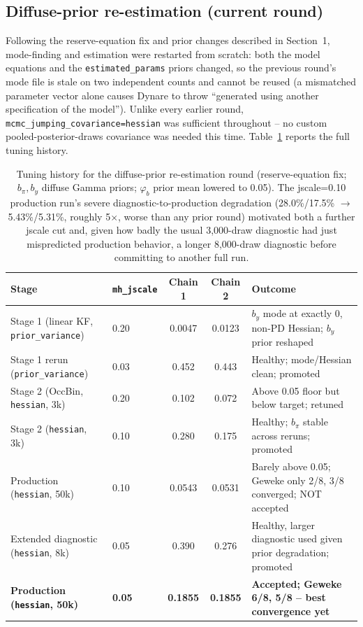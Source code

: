 \documentclass[11pt]{article}
\begin{document}
\subsection{Diffuse-prior re-estimation (current round)}
\label{sec:diffuse}

Following the reserve-equation fix and prior changes described in
Section~1, mode-finding and estimation were restarted from scratch: both
the model equations and the \texttt{estimated\_params} priors changed,
so the previous round's mode file is stale on two independent counts and
cannot be reused (a mismatched parameter vector alone causes Dynare to
throw ``generated using another specification of the model''). Unlike
every earlier round, \texttt{mcmc\_jumping\_covariance=hessian} was
sufficient throughout -- no custom pooled-posterior-draws covariance was
needed this time. Table~\ref{tab:jscale2} reports the full tuning
history.

\begin{table}[h]
\centering
\small
\begin{tabular}{@{}llccl@{}}
\toprule
Stage & \texttt{mh\_jscale} & Chain 1 & Chain 2 & Outcome \\
\midrule
Stage 1 (linear KF, \texttt{prior\_variance}) & 0.20 & 0.0047 & 0.0123 & $b_y$ mode at exactly 0, non-PD Hessian; $b_y$ prior reshaped \\
Stage 1 rerun (\texttt{prior\_variance}) & 0.03 & 0.452 & 0.443 & Healthy; mode/Hessian clean; promoted \\
Stage 2 (OccBin, \texttt{hessian}, 3k) & 0.20 & 0.102 & 0.072 & Above 0.05 floor but below target; retuned \\
Stage 2 (\texttt{hessian}, 3k) & 0.10 & 0.280 & 0.175 & Healthy; $b_\pi$ stable across reruns; promoted \\
Production (\texttt{hessian}, 50k) & 0.10 & 0.0543 & 0.0531 & Barely above 0.05; Geweke only 2/8, 3/8 converged; NOT accepted \\
Extended diagnostic (\texttt{hessian}, 8k) & 0.05 & 0.390 & 0.276 & Healthy, larger diagnostic used given prior degradation; promoted \\
\textbf{Production (\texttt{hessian}, 50k)} & \textbf{0.05} & \textbf{0.1855} & \textbf{0.1855} & \textbf{Accepted; Geweke 6/8, 5/8 -- best convergence yet} \\
\bottomrule
\end{tabular}
\caption{Tuning history for the diffuse-prior re-estimation round
(reserve-equation fix; $b_\pi,b_y$ diffuse Gamma priors; $\varphi_b$
prior mean lowered to 0.05). The jscale=0.10 production run's severe
diagnostic-to-production degradation (28.0\%/17.5\% $\to$ 5.43\%/5.31\%,
roughly 5$\times$, worse than any prior round) motivated both a further
jscale cut and, given how badly the usual 3{,}000-draw diagnostic had
just mispredicted production behavior, a longer 8{,}000-draw diagnostic
before committing to another full run.}
\label{tab:jscale2}
\end{table}
\end{document}
